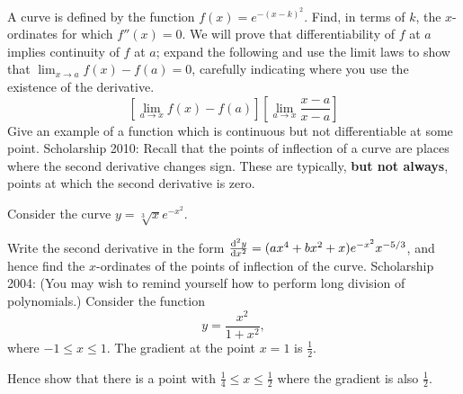 \begin{questions}
  \questioE A curve is defined by the function $ f(x) = e^{-(x-k)^2} $. Find, in terms of $ k $, the $ x$-ordinates for which $ f''(x) = 0 $.
  \clearpage
  \questioS We will prove that differentiability of $ f $ at $ a $ implies continuity of $ f $ at $ a $; expand the following
            and use the limit laws to show that $ \lim_{x \to a} f(x) - f(a) = 0 $, carefully indicating where you use the existence
            of the derivative.
            \begin{displaymath}
              \left[\lim_{a \to x} f(x) - f(a)\right]\left[\lim_{a \to x} \frac{x - a}{x - a}\right]
            \end{displaymath}
  \questioE Give an example of a function which is continuous but not differentiable at some point.
  \questioS Scholarship 2010: Recall that the points of inflection of a curve are places where the second derivative
            changes sign. These are typically, \textbf{but not always}, points at which the second derivative is zero.

            Consider the curve $ y = \sqrt[3]{x} e^{-x^2} $.

            Write the second derivative in the form $ \od[2]{y}{x} = (ax^4 + bx^2 + x)e^{-x^2} x^{-5/3} $, and hence
            find the $ x$-ordinates of the points of inflection of the curve.
  \questioS Scholarship 2004: (You may wish to remind yourself how to perform long division of polynomials.) Consider the function
            \begin{displaymath}
              y = \frac{x^2}{1 + x^2},
            \end{displaymath}
            where $ -1 \leq x \leq 1 $. The gradient at the point $ x = 1 $ is $ \frac{1}{2} $.

            Hence show that there is a point with $ \frac{1}{4} \leq x \leq \frac{1}{2} $ where the gradient is also $ \frac{1}{2} $.
\end{questions}

